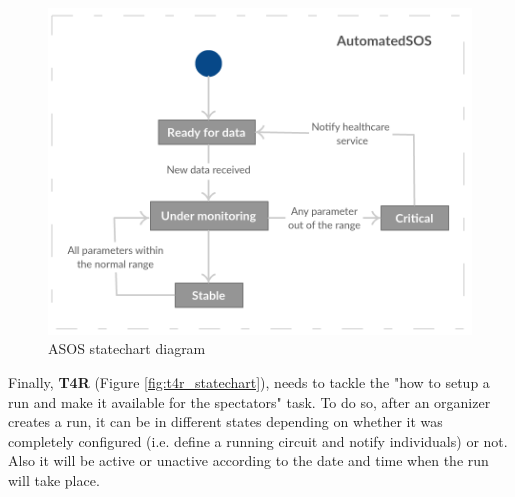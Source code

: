 \documentclass[hidelinks, 12pt]{report}
\begin{document}
 \begin{figure}[H]
\centering
 \includegraphics[scale=0.55]{Diagrams/asos_statechart.png}
\caption[ASOS statechart diagram]{ASOS statechart diagram}
\label{fig:asos_statechart}
\end{figure}

Finally, \textbf {T4R} (Figure \ref{fig:t4r_statechart}), needs to tackle the "how to setup a run and make it available for the spectators" task. To do so, after an organizer creates a run, it can be in different states depending on whether it was completely configured (i.e. define a running circuit and notify individuals) or not. Also it will be active or unactive according to the date and time when the run will take place.
\end{document}
